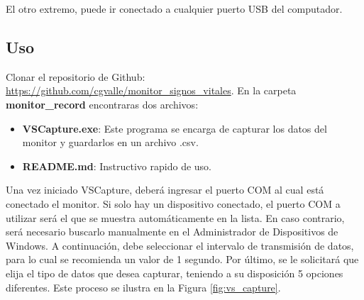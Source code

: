 \documentclass{article}
\begin{document}
El otro extremo, puede ir conectado a cualquier puerto USB del computador.



\subsection{Uso}
Clonar el repositorio de Github: \url{https://github.com/cgvalle/monitor_signos_vitales}. En la carpeta \textbf{monitor\_record} encontraras dos archivos:
\begin{itemize}
	\item \textbf{VSCapture.exe}: Este programa se encarga de capturar los datos del monitor y guardarlos en un archivo .csv.
	\item \textbf{README.md}: Instructivo rapido de uso.
\end{itemize}

Una vez iniciado VSCapture, deberá ingresar el puerto COM al cual está conectado el monitor. Si solo hay un dispositivo conectado, el puerto COM a utilizar será el que se muestra automáticamente en la lista. En caso contrario, será necesario buscarlo manualmente en el Administrador de Dispositivos de Windows. A continuación, debe seleccionar el intervalo de transmisión de datos, para lo cual se recomienda un valor de 1 segundo. Por último, se le solicitará que elija el tipo de datos que desea capturar, teniendo a su disposición 5 opciones diferentes. Este proceso se ilustra en la Figura \ref{fig:vs_capture}.
\end{document}
